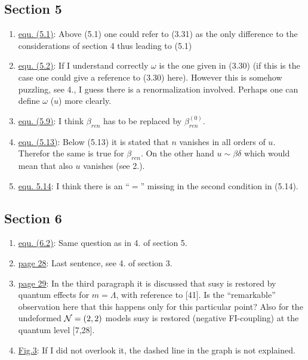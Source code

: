 \documentclass[a4paper,12pt]{article}
\begin{document}
\subsection*{Section 5}

\begin{enumerate}

\item \underline{equ. (5.1)}: Above (5.1) one could refer to (3.31) as
the only difference to the considerations of section 4 thus leading to
(5.1)

\item \underline{equ. (5.2)}: If I understand correctly $\omega$ is
the one given in (3.30) (if this is the case one could give a
reference to (3.30) here). However this is somehow puzzling, see 4., I
guess there is a renormalization involved. Perhaps one can define
$\omega$ ($u$) more clearly.

\item \underline{equ. (5.9)}: I think $\beta_{ren}$ has to be replaced
by $\beta^{(0)}_{ren}$.

\item \underline{equ. (5.13)}: Below (5.13) it is stated that $n$
vanishes in all orders of $u$. Therefor the same is true for
$\beta_{ren}$. On the other hand $u\sim \beta \delta$ which would mean
that also $u$ vanishes (see 2.).

\item \underline{equ. 5.14}: I think there is an ``$=$'' missing in
the second condition in (5.14).

\end{enumerate}

\subsection*{Section 6}

\begin{enumerate}

\item \underline{equ. (6.2)}: Same question as in 4. of section 5.

\item \underline{page 28}: Last sentence, see 4. of section 3.

\item \underline{page 29}: In the third paragraph it is discussed that
susy is restored by quantum effects for $m=\Lambda$, with reference to
[41]. Is the ``remarkable'' observation here that this happens only
for this particular point? Also for the undeformed ${\cal N}=(2,2)$
models susy is restored (negative FI-coupling) at the quantum level
[7,28].

\item \underline{Fig.3}: If I did not overlook it, the dashed line in
the graph is not explained.

\end{enumerate}
\end{document}

